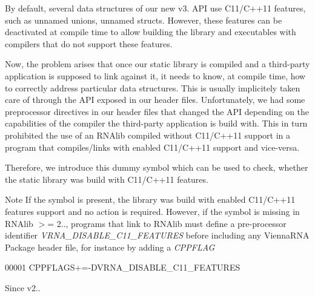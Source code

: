 By default, several data structures of our new v3. A\+PI use C11/\+C++11 features, such as unnamed unions, unnamed structs. However, these features can be deactivated at compile time to allow building the library and executables with compilers that do not support these features.

Now, the problem arises that once our static library is compiled and a third-\/party application is supposed to link against it, it needs to know, at compile time, how to correctly address particular data structures. This is usually implicitely taken care of through the A\+PI exposed in our header files. Unfortunately, we had some preprocessor directives in our header files that changed the A\+PI depending on the capabilities of the compiler the third-\/party application is build with. This in turn prohibited the use of an R\+N\+Alib compiled without C11/\+C++11 support in a program that compiles/links with enabled C11/\+C++11 support and vice-\/versa.

Therefore, we introduce this dummy symbol which can be used to check, whether the static library was build with C11/\+C++11 features.

\begin{DoxyNote}{Note}
If the symbol is present, the library was build with enabled C11/\+C++11 features support and no action is required. However, if the symbol is missing in R\+N\+Alib $>$= 2.., programs that link to R\+N\+Alib must define a pre-\/processor identifier {\itshape V\+R\+N\+A\+\_\+\+D\+I\+S\+A\+B\+L\+E\+\_\+\+C11\+\_\+\+F\+E\+A\+T\+U\+R\+ES} before including any Vienna\+R\+NA Package header file, for instance by adding a {\itshape C\+P\+P\+F\+L\+AG} 
\begin{DoxyCode}
00001 CPPFLAGS+=-DVRNA\_DISABLE\_C11\_FEATURES
\end{DoxyCode}

\end{DoxyNote}
\begin{DoxySince}{Since}
v2.. 
\end{DoxySince}
